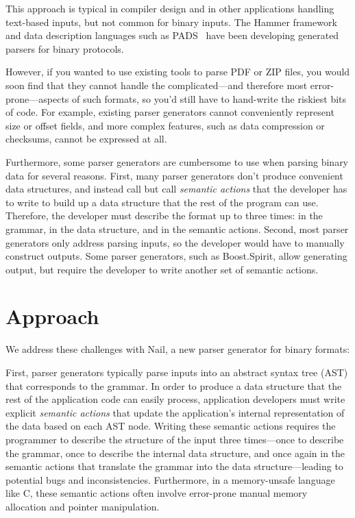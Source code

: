 \documentclass[a4paper]{article}
\begin{document}
This approach is typical in compiler design and in other applications handling text-based inputs, but not
common for binary inputs. The Hammer framework~\cite{hammer-parser} and data description languages such as
PADS~\cite{Fisher:2005:PDL:1064978.1065046} have been developing generated parsers for binary protocols.

However, if you wanted to use existing tools to parse PDF
or ZIP files, you would soon find that they cannot handle the complicated---and therefore most
error-prone---aspects of such formats, so you'd still have to
hand-write the riskiest bits of code. For example, existing parser generators cannot conveniently represent size or offset fields, and more complex features, such as data compression or checksums, cannot be expressed at all.


Furthermore, some parser generators are cumbersome to use when parsing binary data for several
reasons. First, many parser generators don't produce convenient data structures, and instead call
but call \emph{semantic actions} that the developer has to write to build up a data structure that
the rest of the program can use. Therefore, the developer must
describe the format up to three times: in the grammar, in the data structure, and in the semantic
actions. Second, most parser generators only address parsing inputs, so the developer would have to manually
construct outputs. Some parser generators, such as 
Boost.Spirit, allow generating output, but require the developer to write another set of semantic actions. 
\section{Approach}

We address these challenges with Nail, a new parser generator for binary formats:


First, parser generators typically parse inputs into an abstract syntax
tree (AST) that corresponds to the grammar.  In order to produce a data
structure that the rest of the application code can easily process,
application developers must write explicit {\em semantic actions} that
update the application's internal representation of the data based on
each AST node.  
Writing these semantic actions requires the programmer to describe the
structure of the input three
times---once to describe the grammar, once to describe the internal data
structure, and once again in the semantic actions that translate the
grammar into the data structure---leading to potential bugs and
inconsistencies.
Furthermore, in a memory-unsafe language like C, these semantic
actions often involve error-prone manual memory allocation and
pointer manipulation.
\end{document}
